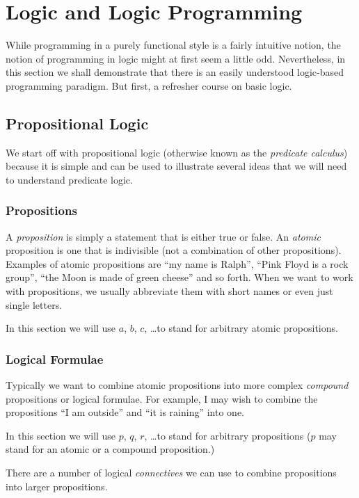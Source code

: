 \section{Logic and Logic Programming}

While programming in a purely functional style is a fairly intuitive
notion, the notion of programming in logic might at first seem a little
odd.  Nevertheless, in this section we shall demonstrate that there is
an easily understood logic-based programming paradigm.  But first, a
refresher course on basic logic.

\subsection{Propositional Logic}

We start off with propositional logic (otherwise known as the
\emph{predicate calculus}) because it is simple and can be used to
illustrate several ideas that we will need to understand predicate
logic.

\subsubsection{Propositions}

A \emph{proposition} is simply a statement that is either true or false.
An \emph{atomic} proposition is one that is indivisible (\ie not a
combination of other propositions).  Examples of atomic propositions are
``my name is Ralph'', ``Pink Floyd is a rock group'', ``the Moon is made
of green cheese'' and so forth.  When we want to work with propositions,
we usually abbreviate them with short names or even just single letters.

In this section we will use $a$, $b$, $c$, \ldots to stand for arbitrary
atomic propositions.

\subsubsection{Logical Formulae}

Typically we want to combine atomic propositions into more complex
\emph{compound} propositions or logical formulae.  For example, I may
wish to combine the propositions ``I am outside'' and ``it is raining''
into one.

In this section we will use $p$, $q$, $r$, \ldots to stand for arbitrary
propositions (\ie $p$ may stand for an atomic or a compound
proposition.)

There are a number of logical \emph{connectives} we can use to combine
propositions into larger propositions.

